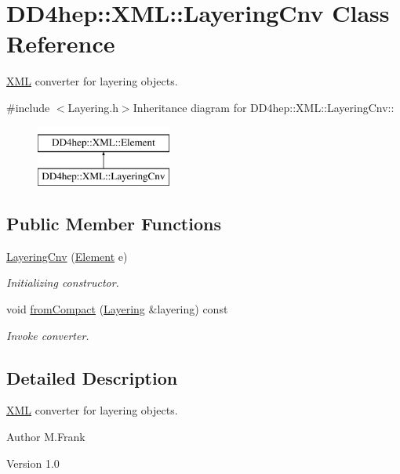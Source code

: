 \hypertarget{class_d_d4hep_1_1_x_m_l_1_1_layering_cnv}{
\section{DD4hep::XML::LayeringCnv Class Reference}
\label{class_d_d4hep_1_1_x_m_l_1_1_layering_cnv}
}


\hyperlink{namespace_d_d4hep_1_1_x_m_l}{XML} converter for layering objects.  


{\ttfamily \#include $<$Layering.h$>$}Inheritance diagram for DD4hep::XML::LayeringCnv::\begin{figure}[H]
\begin{center}
\leavevmode
\includegraphics[height=2cm]{class_d_d4hep_1_1_x_m_l_1_1_layering_cnv}
\end{center}
\end{figure}
\subsection*{Public Member Functions}
\begin{DoxyCompactItemize}
\item 
\hyperlink{class_d_d4hep_1_1_x_m_l_1_1_layering_cnv_ab6b99c78432dbaf778778eb47163eda7}{LayeringCnv} (\hyperlink{class_d_d4hep_1_1_x_m_l_1_1_element}{Element} e)
\begin{DoxyCompactList}\small\item\em Initializing constructor. \item\end{DoxyCompactList}\item 
void \hyperlink{class_d_d4hep_1_1_x_m_l_1_1_layering_cnv_a458cb449e483e9a5a7a146047f4a3ac5}{fromCompact} (\hyperlink{class_d_d4hep_1_1_layering}{Layering} \&layering) const 
\begin{DoxyCompactList}\small\item\em Invoke converter. \item\end{DoxyCompactList}\end{DoxyCompactItemize}


\subsection{Detailed Description}
\hyperlink{namespace_d_d4hep_1_1_x_m_l}{XML} converter for layering objects. \begin{DoxyAuthor}{Author}
M.Frank 
\end{DoxyAuthor}
\begin{DoxyVersion}{Version}
1.0 
\end{DoxyVersion}


